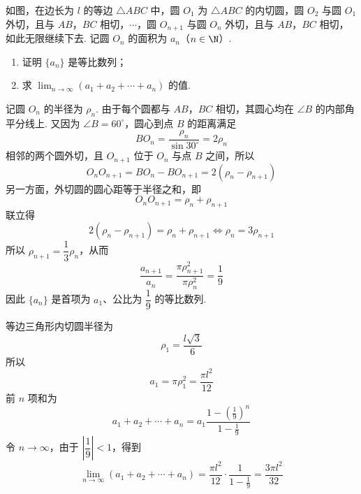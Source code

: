 \begin{problem}
如图，在边长为 \(l\) 的等边 \(\triangle ABC\) 中，圆 \(O_1\) 为 \(\triangle ABC\) 的内切圆，圆 \(O_2\) 与圆 \(O_1\) 外切，且与 \(AB\)，\(BC\) 相切，\(\cdots\)，圆 \(O_{n+1}\) 与圆 \(O_n\) 外切，且与 \(AB\)，\(BC\) 相切，如此无限继续下去. 记圆 \(O_n\) 的面积为 \(a_n\)（\(n\in\N\)）.

\begin{enumerate}
\item 证明 \(\{a_n\}\) 是等比数列；
\item 求 \(\displaystyle\lim_{n\to\infty}(a_1+a_2+\cdots+a_n)\) 的值.
\end{enumerate}


\begin{solution}
记圆 \(O_n\) 的半径为 \(\rho_n\). 由于每个圆都与 \(AB\)，\(BC\) 相切，其圆心均在 \(\angle B\) 的内部角平分线上. 又因为 \(\angle B=60^{\circ}\)，圆心到点 \(B\) 的距离满足
\[
BO_n=\frac{\rho_n}{\sin30^{\circ}}=2\rho_n
\]
相邻的两个圆外切，且 \(O_{n+1}\) 位于 \(O_n\) 与点 \(B\) 之间，所以
\[
O_nO_{n+1}=BO_n-BO_{n+1}=2(\rho_n-\rho_{n+1})
\]
另一方面，外切圆的圆心距等于半径之和，即
\[
O_nO_{n+1}=\rho_n+\rho_{n+1}
\]
联立得
\[
2(\rho_n-\rho_{n+1})=\rho_n+\rho_{n+1}
\Longleftrightarrow \rho_n=3\rho_{n+1}
\]
所以 \(\rho_{n+1}=\dfrac13\rho_n\)，从而
\[
\frac{a_{n+1}}{a_n}=\frac{\pi\rho_{n+1}^2}{\pi\rho_n^2}=\frac19
\]
因此 \(\{a_n\}\) 是首项为 \(a_1\)、公比为 \(\dfrac19\) 的等比数列.

等边三角形内切圆半径为
\[
\rho_1=\frac{l\sqrt3}{6}
\]
所以
\[
a_1=\pi\rho_1^2=\frac{\pi l^2}{12}
\]
前 \(n\) 项和为
\[
a_1+a_2+\cdots+a_n
=a_1\frac{1-(\frac{1}{9})^n}{1-\frac{1}{9}}
\]
令 \(n\to\infty\)，由于 \(\left|\dfrac19\right|<1\)，得到
\[
\lim_{n\to\infty}(a_1+a_2+\cdots+a_n)
=\frac{\pi l^2}{12}\cdot\frac{1}{1-\frac{1}{9}}
=\frac{3\pi l^2}{32}
\]
\end{solution}
\end{problem}
